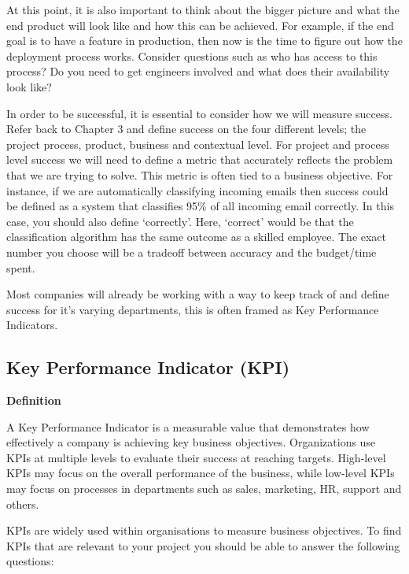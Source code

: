 \documentclass[
]{book}
\begin{document}
At this point, it is also important to think about the bigger picture and what the end product will look like and how this can be achieved. For example, if the end goal is to have a feature in production, then now is the time to figure out how the deployment process works. Consider questions such as who has access to this process? Do you need to get engineers involved and what does their availability look like?

In order to be successful, it is essential to consider how we will measure success. Refer back to Chapter 3 and define success on the four different levels; the project process, product, business and contextual level. For project and process level success we will need to define a metric that accurately reflects the problem that we are trying to solve. This metric is often tied to a business objective. For instance, if we are automatically classifying incoming emails then success could be defined as a system that classifies 95\% of all incoming email correctly. In this case, you should also define `correctly'. Here, `correct' would be that the classification algorithm has the same outcome as a skilled employee. The exact number you choose will be a tradeoff between accuracy and the budget/time spent.

Most companies will already be working with a way to keep track of and define success for it's varying departments, this is often framed as Key Performance Indicators.

\hypertarget{key-performance-indicator-kpi}{%
\subsection{Key Performance Indicator (KPI)}\label{key-performance-indicator-kpi}}

\begin{infobox}

\textbf{Definition}

A Key Performance Indicator is a measurable value that demonstrates how effectively a company is achieving key business objectives. Organizations use KPIs at multiple levels to evaluate their success at reaching targets. High-level KPIs may focus on the overall performance of the business, while low-level KPIs may focus on processes in departments such as sales, marketing, HR, support and others.

\end{infobox}

KPIs are widely used within organisations to measure business objectives. To find KPIs that are relevant to your project you should be able to answer the following questions:
\end{document}
